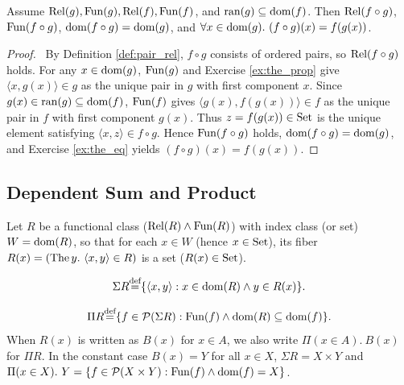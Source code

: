 \documentclass[10pt,a4paper]{article}
\renewcommand{\myprf}{\begin{proof}}
\renewcommand{\myqed}{\end{proof}}
\begin{document}
\begin{lemma}\label{lem:fun_comp}
Assume ${\textrm{Rel}}(g), {\textrm{Fun}}(g), {\textrm{Rel}}(f), {\textrm{Fun}}(f)$, and ${\textrm{ran}}(g) \subseteq {\textrm{dom}}(f)$. Then ${\textrm{Rel}}(f \circ g)$, ${\textrm{Fun}}(f \circ g)$, ${\textrm{dom}}(f \circ g) = {\textrm{dom}}(g)$, and $\forall x \in {\textrm{dom}}(g).\ (f \circ g)(x) = f(g(x))$.
\end{lemma}
\myprf\ By Definition \ref{def:pair_rel}, $f \circ g$ consists of ordered pairs, so ${\textrm{Rel}}(f \circ g)$ holds. For any $x \in {\textrm{dom}}(g)$, ${\textrm{Fun}}(g)$ and Exercise \ref{ex:the_prop} give $\langle x, g(x) \rangle \in g$ as the unique pair in $g$ with first component $x$. Since $g(x) \in {\textrm{ran}}(g) \subseteq {\textrm{dom}}(f)$, ${\textrm{Fun}}(f)$ gives $\langle g(x), f(g(x)) \rangle \in f$ as the unique pair in $f$ with first component $g(x)$. Thus $z = f(g(x)) \in {\textrm{Set}}$ is the unique element satisfying $\langle x, z \rangle \in f \circ g$. Hence ${\textrm{Fun}}(f \circ g)$ holds, ${\textrm{dom}}(f \circ g) = {\textrm{dom}}(g)$, and Exercise \ref{ex:the_eq} yields $(f \circ g)(x) = f(g(x))$. \myqed

\subsection{Dependent Sum and Product}\label{sec:sigma_pi}
Let $R$ be a functional class (${\textrm{Rel}}(R) \land {\textrm{Fun}}(R)$) with index class (or set) $W = {\textrm{dom}}(R)$, so that for each $x \in W$ (hence $x \in {\textrm{Set}}$), its fiber $R(x) = ({\textrm{The\,}} y.\ \langle x, y \rangle \in R)$ is a set ($R(x) \in {\textrm{Set}}$).
\begin{definition}
$$\Sigma R {\stackrel{{\textrm{def}}}{=}} \{\langle x, y\rangle : x \in {\textrm{dom}}(R) \land y\in R(x)\}.$$
\end{definition}
\begin{definition}
$$\Pi R {\stackrel{{\textrm{def}}}{=}} \{ f\in {\mathcal{P}}(\Sigma R) : {\textrm{Fun}}(f) \land {\textrm{dom}}(R)\subseteq {\textrm{dom}}(f)\}.$$
When $R(x)$ is written as $B(x)$ for $x \in A$, we also write $\Pi(x \in A).\ B(x)$ for $\Pi R$. In the constant case $B(x) = Y$ for all $x \in X$, $\Sigma R = X \times Y$ and $\Pi(x \in X).\ Y = \{f \in {\mathcal{P}}(X \times Y) : {\textrm{Fun}}(f) \land {\textrm{dom}}(f) = X\}$.
\end{definition}
\end{document}
